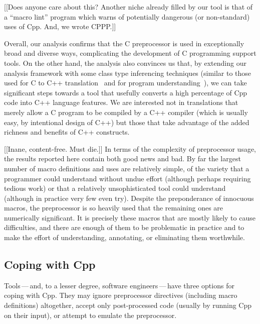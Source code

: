 \documentclass[10pt]{article}
\begin{document}
[[Does anyone care about this?
Another niche already filled by our tool is that of a ``macro lint''
program which warns of potentially dangerous (or non-standard) uses of Cpp.
And, we wrote CPPP.]]








Overall, our analysis confirms that the C preprocessor is used in
exceptionally broad and diverse ways, complicating the development of C
programming support tools.  On the other hand, the analysis also convinces
us that, by extending our analysis framework with some class type
inferencing techniques (similar to those used for C to C++
translation~\cite{Siff-fse96} and for program
understanding~\cite{OCallahan-icse97}), we can take significant
steps towards a tool that usefully converts a high percentage of Cpp code
into C++ language features.  We are interested not in translations
that merely allow a C program to be compiled by a C++ compiler (which is
usually easy, by intentional design of C++) but those that take advantage
of the added richness and benefits of C++ constructs.

[[Inane, content-free.  Must die.]]
In terms of the complexity of preprocessor usage, the results reported here
contain both good news and bad.  By far
the largest number of macro definitions and uses are relatively simple, of
the variety that a programmer could understand without undue effort (although
perhaps requiring tedious work) or that a relatively unsophisticated tool
could understand (although in practice very few even try).  Despite the
preponderance of innocuous macros, the preprocessor is so heavily used that
the remaining ones are numerically significant.  It is precisely these
macros that are mostly likely to cause difficulties, and there are enough
of them to be problematic in practice and to make the effort of
understanding, annotating, or eliminating them worthwhile.


\subsection{Coping with Cpp}

Tools\,---\,and, to a lesser degree, software engineers\,---\,have three
options for coping with Cpp.    They may ignore preprocessor directives
(including macro definitions) altogether, accept only post-processed code
(usually by running Cpp on their input), or attempt to emulate the
preprocessor.
\end{document}
